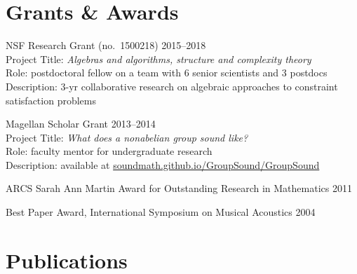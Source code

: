 \documentclass[margin,line]{resume}
\begin{document}
\begin{resume}
    \vspace{-1mm}
    \section{\mysidestyle Grants \& Awards}

    NSF Research Grant {\small (no.~1500218)} \hfill 2015--2018\\
    Project Title: \textsl{Algebras and algorithms, structure and complexity theory}\\ 
    Role: postdoctoral fellow on a team with 6 senior scientists and 3 postdocs\\
    Description: 3-yr collaborative research on algebraic approaches to constraint satisfaction problems

    \vspace{-1mm}
    Magellan Scholar Grant \hfill     2013--2014\\
    Project Title: \textsl{What does a nonabelian group sound like?}\\
    Role: faculty mentor for undergraduate research\\
    Description: available at {\small \href{http://soundmath.github.io/GroupSound/}{soundmath.github.io/GroupSound/GroupSound}}

    \vspace{-2mm}
    ARCS Sarah Ann Martin Award for Outstanding Research in Mathematics \hfill 2011

    \vspace{-2mm}
    Best Paper Award, International Symposium on Musical Acoustics \hfill  2004 

\vspace{-2mm}
    \section{\mysidestyle Publications}

    
    



\end{resume}
\end{document}
